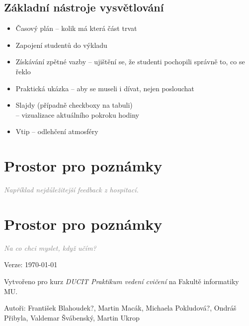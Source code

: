 \documentclass[twoside,openany,10pt]{book}
\newcommand{\note}[1]{\textcolor{gray}{\small\itshape #1}}
\begin{document}
\section*{Základní nástroje vysvětlování}
\begin{itemize}
\item Časový plán -- kolik má která část trvat
\item Zapojení studentů do výkladu
\item Získávání zpětné vazby -- ujištění se, že studenti pochopili správně to, co se řeklo
\item Praktická ukázka -- aby se museli i dívat, nejen poslouchat
\item Slajdy (případně checkboxy na tabuli)\\ -- vizualizace aktuálního pokroku hodiny
\item Vtip -- odlehčení atmosféry
\end{itemize}

\chapter*{Prostor pro poznámky}
\note{Například nejdůležitejší feedback z hospitací.}

\chapter*{Prostor pro poznámky}
\note{Na co chci myslet, když učím?}

\newpage
\vspace*{\fill}
Verze: \today

Vytvořeno pro kurz \textit{DUCIT Praktikum vedení cvičení} na Fakultě informatiky MU.

Autoři: František Blahoudek?, Martin Macák, Michaela Pokludová?, Ondráš Přibyla, Valdemar Švábenský, Martin Ukrop
\end{document}
